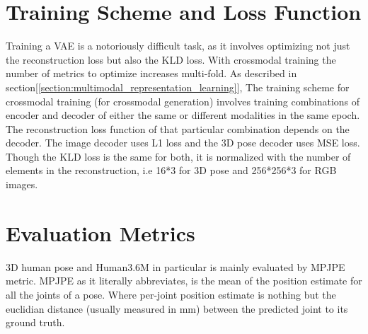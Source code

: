 \section{Training Scheme and Loss Function}
Training a \ac{VAE} is a notoriously difficult task, as it involves optimizing not just the reconstruction loss but also the \ac{KLD} loss. With crossmodal training the number of metrics to optimize increases multi-fold. As described in section[\ref{section:multimodal_representation_learning}], The training scheme for crossmodal training (for crossmodal generation) involves training combinations of encoder and decoder of either the same or different modalities in the same epoch. The reconstruction loss function of that particular combination depends on the decoder. The image decoder uses \ac{L1} loss and the 3D pose decoder uses \ac{MSE} loss. Though the \ac{KLD} loss is the same for both, it is normalized with the number of elements in the reconstruction, i.e 16*3 for 3D pose and 256*256*3 for RGB images.

\section{Evaluation Metrics}
3D human pose and Human3.6M in particular is mainly evaluated by \ac{MPJPE} metric. MPJPE as it literally abbreviates, is the mean of the position estimate for all the joints of a pose. Where per-joint position estimate is nothing but the euclidian distance (usually measured in mm) between the predicted joint to its ground truth. 